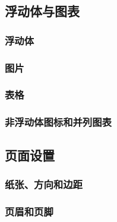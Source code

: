\documentclass[twoside]{ctexart}
\begin{document}
    \subsection{浮动体与图表}

        \subsubsection{浮动体}

        \subsubsection{图片}

        \subsubsection{表格}

        \subsubsection{非浮动体图标和并列图表}

    \subsection{页面设置}
        \subsubsection{纸张、方向和边距}

        \subsubsection{页眉和页脚}
\end{document}
